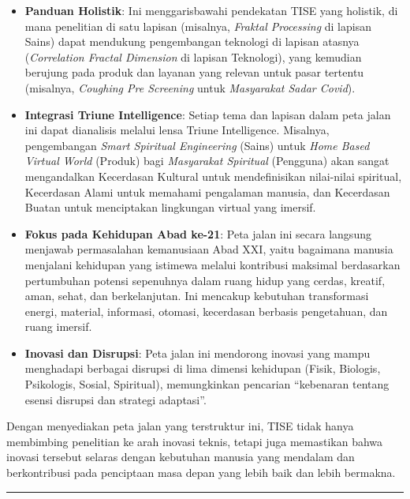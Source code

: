 \documentclass[
  letterpaper,
  DIV=11,
  numbers=noendperiod]{scrreprt}
\providecommand{\tightlist}{%
  \setlength{\itemsep}{0pt}\setlength{\parskip}{0pt}}
\begin{document}
\begin{itemize}
\tightlist
\item
  \textbf{Panduan Holistik}: Ini menggarisbawahi pendekatan TISE yang
  holistik, di mana penelitian di satu lapisan (misalnya, \emph{Fraktal
  Processing} di lapisan Sains) dapat mendukung pengembangan teknologi
  di lapisan atasnya (\emph{Correlation Fractal Dimension} di lapisan
  Teknologi), yang kemudian berujung pada produk dan layanan yang
  relevan untuk pasar tertentu (misalnya, \emph{Coughing Pre Screening}
  untuk \emph{Masyarakat Sadar Covid}).
\item
  \textbf{Integrasi Triune Intelligence}: Setiap tema dan lapisan dalam
  peta jalan ini dapat dianalisis melalui lensa Triune Intelligence.
  Misalnya, pengembangan \emph{Smart Spiritual Engineering} (Sains)
  untuk \emph{Home Based Virtual World} (Produk) bagi \emph{Masyarakat
  Spiritual} (Pengguna) akan sangat mengandalkan Kecerdasan Kultural
  untuk mendefinisikan nilai-nilai spiritual, Kecerdasan Alami untuk
  memahami pengalaman manusia, dan Kecerdasan Buatan untuk menciptakan
  lingkungan virtual yang imersif.
\item
  \textbf{Fokus pada Kehidupan Abad ke-21}: Peta jalan ini secara
  langsung menjawab permasalahan kemanusiaan Abad XXI, yaitu bagaimana
  manusia menjalani kehidupan yang istimewa melalui kontribusi maksimal
  berdasarkan pertumbuhan potensi sepenuhnya dalam ruang hidup yang
  cerdas, kreatif, aman, sehat, dan berkelanjutan. Ini mencakup
  kebutuhan transformasi energi, material, informasi, otomasi,
  kecerdasan berbasis pengetahuan, dan ruang imersif.
\item
  \textbf{Inovasi dan Disrupsi}: Peta jalan ini mendorong inovasi yang
  mampu menghadapi berbagai disrupsi di lima dimensi kehidupan (Fisik,
  Biologis, Psikologis, Sosial, Spiritual), memungkinkan pencarian
  ``kebenaran tentang esensi disrupsi dan strategi adaptasi''.
\end{itemize}

Dengan menyediakan peta jalan yang terstruktur ini, TISE tidak hanya
membimbing penelitian ke arah inovasi teknis, tetapi juga memastikan
bahwa inovasi tersebut selaras dengan kebutuhan manusia yang mendalam
dan berkontribusi pada penciptaan masa depan yang lebih baik dan lebih
bermakna.

\begin{center}\rule{0.5\linewidth}{0.5pt}\end{center}

\end{document}
